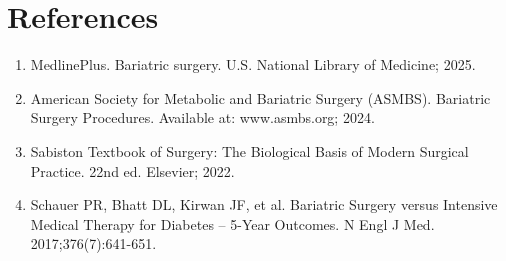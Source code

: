 \section*{References}
\begin{enumerate}
  \item MedlinePlus. Bariatric surgery. U.S. National Library of Medicine; 2025.
  \item American Society for Metabolic and Bariatric Surgery (ASMBS). Bariatric Surgery Procedures. Available at: www.asmbs.org; 2024.
  \item Sabiston Textbook of Surgery: The Biological Basis of Modern Surgical Practice. 22nd ed. Elsevier; 2022.
  \item Schauer PR, Bhatt DL, Kirwan JF, et al. Bariatric Surgery versus Intensive Medical Therapy for Diabetes -- 5-Year Outcomes. N Engl J Med. 2017;376(7):641-651.
\end{enumerate}

\clearpage
